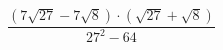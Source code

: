 \begin{ex}[type=calculate]
	\begin{condition}
		\( \dfrac{(7\sqrt{27}-7\sqrt{8})\cdot(\sqrt{27}+\sqrt{8})}{27^2-64} \)
	\end{condition}
\end{ex}